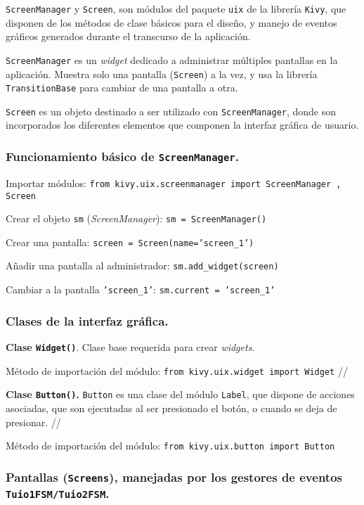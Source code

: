 \texttt{ScreenManager} y \texttt{Screen}, son módulos del paquete \texttt{uix} de la librería \texttt{Kivy}, que disponen de los métodos de clase básicos para el diseño, y manejo de eventos gráficos generados durante el transcurso de la aplicación. 

\texttt{ScreenManager} es un \emph{widget} dedicado a administrar múltiples pantallas en la aplicación. Muestra solo una pantalla (\texttt{Screen}) a la vez, y usa la librería \texttt{TransitionBase} para cambiar de una pantalla a otra. 

\texttt{Screen} es un objeto destinado a ser utilizado con \texttt{ScreenManager}, donde son incorporados los diferentes elementos que componen la interfaz gráfica de usuario.

\subsubsection{Funcionamiento básico de \texttt{ScreenManager}.}

Importar módulos: \texttt{from kivy.uix.screenmanager import ScreenManager , Screen}

Crear el objeto \texttt{sm} (\emph{ScreenManager}): \texttt{sm = ScreenManager()}

Crear una pantalla: \texttt{screen = Screen(name='screen\_1')}

Añadir una pantalla al administrador: \texttt{sm.add\_widget(screen)}

Cambiar a la pantalla \texttt{'screen\_1'}: \texttt{sm.current = 'screen\_1'}


\subsubsection{Clases de la interfaz gráfica.}

\textbf{Clase \texttt{Widget()}}. Clase base requerida para crear \emph{widgets}.

Método de importación del módulo: \texttt{from kivy.uix.widget import Widget} //

\textbf{Clase \texttt{Button()}.} \texttt{Button} es una clase del módulo \texttt{Label}, que dispone de acciones asociadas, que son ejecutadas al ser presionado el botón, o cuando se deja de presionar. //

Método de importación del módulo: \texttt{from kivy.uix.button import Button}


\subsubsection{Pantallas (\texttt{Screens}), manejadas por los gestores de eventos \texttt{Tuio1FSM/Tuio2FSM}.}

